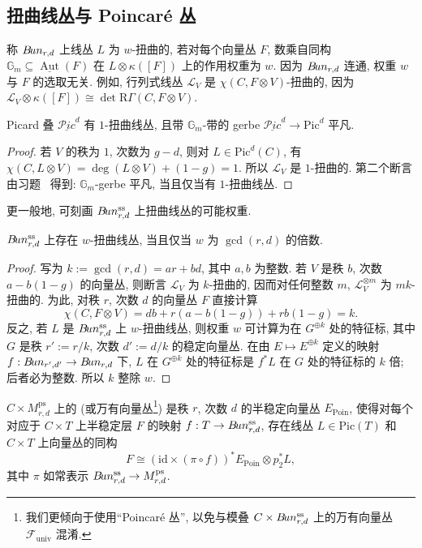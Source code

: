 \subsection{扭曲线丛与 Poincar\'e 丛}\label{src:9.4.4-subsection}
称 $B\!un_{r,d}$ 上线丛 $L$ 为 $w$-扭曲的, 若对每个向量丛 $F$, 数乘自同构 $\mathbb G_m\subseteq\underline{\operatorname{Aut}}(F)$ 在 $L\otimes\kappa([F])$ 上的作用权重为 $w$. 因为 $B\!un_{r,d}$ 连通, 权重 $w$ 与 $F$ 的选取无关. 例如, 行列式线丛 $\mathcal L_V$ 是 $\chi(C,F\otimes V)$-扭曲的, 因为 $\mathcal L_V\otimes\kappa([F])\cong\det\mathrm R\Gamma(C,F\otimes V)$.
\begin{proposition}\label{src:9.4.30}
Picard 叠 $\underline{\mathcal P\!ic}^d$ 有 $1$-扭曲线丛, 且带 $\mathbb G_m$-带的 gerbe $\underline{\mathcal P\!ic}^d\to\mathrm{Pic}^d$ 平凡.
\end{proposition}
\begin{proof}
若 $V$ 的秩为 $1$, 次数为 $g-d$, 则对 $L\in\mathrm{Pic}^d(C)$, 有 $\chi(C,L\otimes V)=\deg(L\otimes V)+(1-g)=1$. 所以 $\mathcal L_V$ 是 $1$-扭曲的. 第二个断言由习题~ 得到: $\mathbb G_m$-gerbe 平凡, 当且仅当有 $1$-扭曲线丛.
\end{proof}
更一般地, 可刻画 $B\!un_{r,d}^{\mathrm{ss}}$ 上扭曲线丛的可能权重.
\begin{proposition}\label{src:9.4.31}
$B\!un_{r,d}^{\mathrm{ss}}$ 上存在 $w$-扭曲线丛, 当且仅当 $w$ 为 $\gcd(r,d)$ 的倍数.
\end{proposition}
\begin{proof}
写为 $k:=\gcd(r,d)=ar+bd$, 其中 $a,b$ 为整数. 若 $V$ 是秩 $b$, 次数 $a-b(1-g)$ 的向量丛, 则断言 $\mathcal L_V$ 为 $k$-扭曲的, 因而对任何整数 $m$, $\mathcal L_V^{\otimes m}$ 为 $mk$-扭曲的. 为此, 对秩 $r$, 次数 $d$ 的向量丛 $F$ 直接计算
\[
\chi(C,F\otimes V)=db+r(a-b(1-g))+rb(1-g)=k.
\]
反之, 若 $L$ 是 $B\!un_{r,d}^{\mathrm{ss}}$ 上 $w$-扭曲线丛, 则权重 $w$ 可计算为在 $G^{\oplus k}$ 处的特征标, 其中 $G$ 是秩 $r':=r/k$, 次数 $d':=d/k$ 的稳定向量丛. 在由 $E\mapsto E^{\oplus k}$ 定义的映射 $f:B\!un_{r',d'}\to B\!un_{r,d}$ 下, $L$ 在 $G^{\oplus k}$ 处的特征标是 $f^*L$ 在 $G$ 处的特征标的 $k$ 倍; 后者必为整数. 所以 $k$ 整除 $w$.
\end{proof}
\begin{definition}\label{src:9.4.32}
$C\times M_{r,d}^{\mathrm{ps}}$ 上的 (或万有向量丛\footnote{我们更倾向于使用``Poincar\'e 丛'', 以免与模叠 $C\times B\!un_{r,d}^{\mathrm{ss}}$ 上的万有向量丛 $\mathcal F_{\mathrm{univ}}$ 混淆.}) 是秩 $r$, 次数 $d$ 的半稳定向量丛 $E_{\mathrm{Poin}}$, 使得对每个对应于 $C\times T$ 上半稳定层 $F$ 的映射 $f:T\to B\!un_{r,d}^{\mathrm{ss}}$, 存在线丛 $L\in\mathrm{Pic}(T)$ 和 $C\times T$ 上向量丛的同构
\[
F\cong(\mathrm{id}\times(\pi\circ f))^*E_{\mathrm{Poin}}\otimes p_2^*L,
\]
其中 $\pi$ 如常表示 $B\!un_{r,d}^{\mathrm{ss}}\to M_{r,d}^{\mathrm{ps}}$.
\end{definition}
